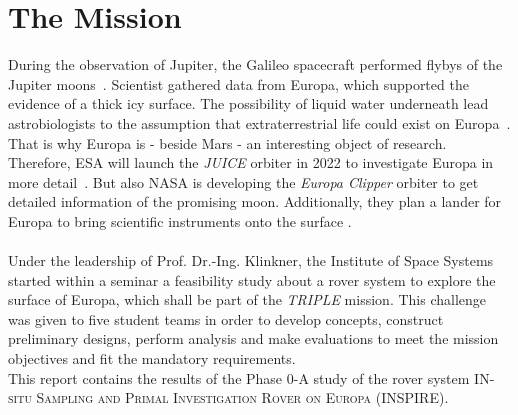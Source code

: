 %
%
%
\chapter{The Mission}
\label{chap:mission}

During the observation of Jupiter, the Galileo spacecraft performed flybys of the Jupiter moons~\cite{Mission_01}.
Scientist gathered data from Europa, which supported the evidence of a thick icy surface.
The possibility of liquid water underneath lead astrobiologists to the assumption that extraterrestrial life could exist on Europa~\cite{Mission_02}.
That is why Europa is - beside Mars - an interesting object of research.\\

Therefore, ESA will launch the \textit{JUICE} orbiter in 2022 to investigate Europa in more detail~\cite{Mission_03}. 
But also NASA is developing the \textit{Europa Clipper} orbiter to get detailed information of the promising moon.
Additionally, they plan a lander for Europa to bring scientific instruments onto the surface \cite{Mission_04, Mission_05}. \\ \\

Under the leadership of Prof. Dr.-Ing. Klinkner, the Institute of Space Systems started within a seminar a feasibility study about a rover system to explore the surface of Europa, which shall be part of the \textit{TRIPLE} mission.
This challenge was given to five student teams in order to develop concepts, construct preliminary designs, perform analysis and make evaluations to meet the mission objectives and fit the mandatory requirements. \\


This report contains the results of the Phase 0-A study of the rover system \textsc{IN-situ Sampling and Primal Investigation Rover on Europa} (INSPIRE).
